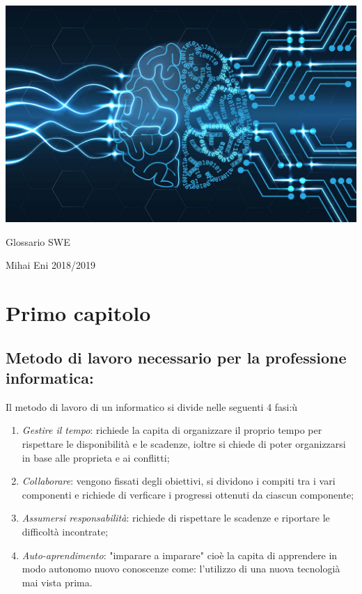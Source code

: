 \documentclass{article}
\begin{document}
\begin{titlepage}
    \centering
    \includegraphics[scale=0.2]{img/swe.jpg}
    \par\vspace{3cm}
    { \fontsize{60}{1}\selectfont Glossario SWE}
    \par\vspace{5cm}
    { \fontsize{40}{1}\selectfont Mihai Eni }
    \vfill
    {\Large{2018/2019}}
\end{titlepage}

\tableofcontents
\newpage

\section{Primo capitolo}

    \subsection{Metodo di lavoro necessario per la professione informatica:}
        Il metodo di lavoro di un informatico si divide nelle seguenti 4 fasi:ù
        \begin{enumerate}[I]
            \item \textit{Gestire il tempo}: richiede la capita di organizzare il proprio tempo per rispettare le disponibilità e le scadenze, ioltre si chiede di poter organizzarsi in base alle proprieta e ai conflitti;
            \item \textit{Collaborare}: vengono fissati degli obiettivi, si dividono i compiti tra i vari componenti e richiede di verficare i progressi ottenuti da ciascun componente; 
            \item \textit{Assumersi responsabilità}: richiede di rispettare le scadenze e riportare le difficoltà incontrate;
            \item \textit{Auto-aprendimento}: "imparare a imparare" cioè la capita di apprendere in modo autonomo nuovo conoscenze come: l'utilizzo di una nuova tecnologià mai vista prima.
            \end{enumerate}
\end{document}
